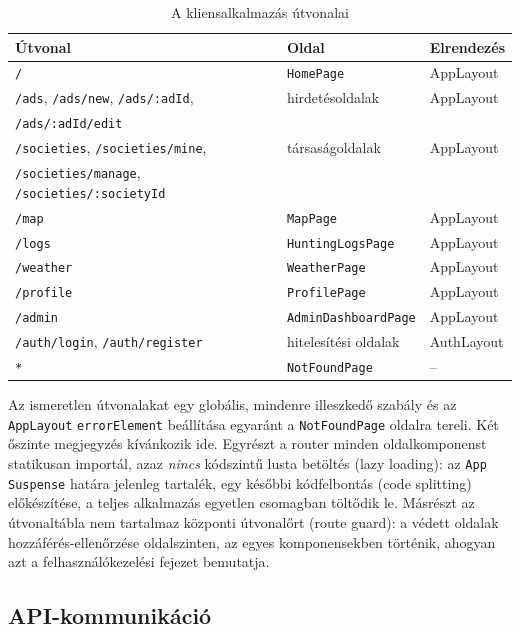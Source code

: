 \begin{table}[htbp]
	\centering
	\caption{A kliensalkalmazás útvonalai}
	\label{tab:routes}
	\begin{tabular}{|l|l|l|}
		\hline
		\textbf{Útvonal} & \textbf{Oldal} & \textbf{Elrendezés} \\
		\hline
		\texttt{/} & \texttt{HomePage} & AppLayout \\
		\hline
		\texttt{/ads}, \texttt{/ads/new}, \texttt{/ads/:adId}, & hirdetésoldalak & AppLayout \\
		\texttt{/ads/:adId/edit} & & \\
		\hline
		\texttt{/societies}, \texttt{/societies/mine}, & társaságoldalak & AppLayout \\
		\texttt{/societies/manage}, \texttt{/societies/:societyId} & & \\
		\hline
		\texttt{/map} & \texttt{MapPage} & AppLayout \\
		\hline
		\texttt{/logs} & \texttt{HuntingLogsPage} & AppLayout \\
		\hline
		\texttt{/weather} & \texttt{WeatherPage} & AppLayout \\
		\hline
		\texttt{/profile} & \texttt{ProfilePage} & AppLayout \\
		\hline
		\texttt{/admin} & \texttt{AdminDashboardPage} & AppLayout \\
		\hline
		\texttt{/auth/login}, \texttt{/auth/register} & hitelesítési oldalak & AuthLayout \\
		\hline
		\texttt{*} & \texttt{NotFoundPage} & -- \\
		\hline
	\end{tabular}
\end{table}

Az ismeretlen útvonalakat egy globális, mindenre illeszkedő szabály és az \texttt{AppLayout}
\texttt{errorElement} beállítása egyaránt a \texttt{NotFoundPage} oldalra tereli. Két őszinte
megjegyzés kívánkozik ide. Egyrészt a router minden oldalkomponenst statikusan importál, azaz
\emph{nincs} kódszintű lusta betöltés (lazy loading): az \texttt{App} \texttt{Suspense} határa
jelenleg tartalék, egy későbbi kódfelbontás (code splitting) előkészítése, a teljes alkalmazás
egyetlen csomagban töltődik le. Másrészt az útvonaltábla nem tartalmaz központi útvonalőrt
(route guard): a védett oldalak hozzáférés-ellenőrzése oldalszinten, az egyes komponensekben
történik, ahogyan azt a felhasználókezelési fejezet bemutatja.

\subsection{API-kommunikáció}

